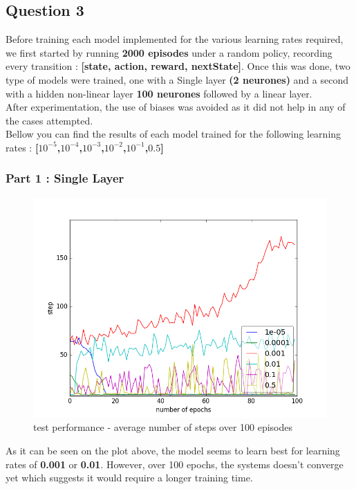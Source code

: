 \documentclass{report}
\begin{document}
\subsection*{Question 3}

Before training each model implemented for the various learning rates required, we first started by running \textbf{2000 episodes} under a random policy, recording every transition : \textbf{[state, action, reward, nextState]}. Once this was done, two type of models were trained, one with a Single layer \textbf{(2 neurones)} and a second with a hidden non-linear layer \textbf{100 neurones} followed by a linear layer. \\

After experimentation, the use of biases was avoided as it did not help in any of the cases attempted. \\ Bellow you can find the results of each model trained for the following learning rates : \textbf{[$10^{-5}$,$10^{-4}$,$10^{-3}$,$10^{-2}$,$10^{-1}$,$0.5$]} \\


\subsubsection*{Part 1 : Single Layer}
\begin{figure}[H]
\centering
\includegraphics[width = \linewidth]{plots/a3-1/step.png}
\caption{test performance - average number of steps over 100 episodes }
\end{figure}

As it can be seen on the plot above, the model seems to learn best for learning rates of \textbf{0.001} or \textbf{0.01}. However, over 100 epochs, the systems doesn't converge yet which suggests it would require a longer training time.
\end{document}
